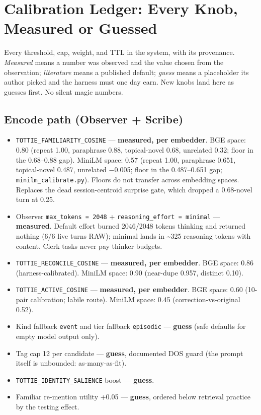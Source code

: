 \chapter{Calibration Ledger: Every Knob, Measured or Guessed}

Every threshold, cap, weight, and TTL in the system, with its provenance.
\textit{Measured} means a number was observed and the value chosen from the
observation; \textit{literature} means a published default; \textit{guess}
means a placeholder its author picked and the harness must one day earn.
New knobs land here as guesses first. No silent magic numbers.

\section{Encode path (Observer + Scribe)}

\begin{itemize}
\item \texttt{TOTTIE\_FAMILIARITY\_COSINE} --- \textbf{measured, per
embedder}. BGE space: 0.80 (repeat 1.00, paraphrase 0.88, topical-novel
0.68, unrelated 0.32; floor in the 0.68--0.88 gap). MiniLM space: 0.57
(repeat 1.00, paraphrase 0.651, topical-novel 0.487, unrelated $-$0.005;
floor in the 0.487--0.651 gap; \texttt{minilm\_calibrate.py}). Floors do
not transfer across embedding spaces. Replaces the dead session-centroid
surprise gate, which dropped a 0.68-novel turn at 0.25.
\item Observer \texttt{max\_tokens = 2048} + \texttt{reasoning\_effort =
minimal} --- \textbf{measured}. Default effort burned 2046/2048 tokens
thinking and returned nothing (6/6 live turns RAW); minimal lands in
\textasciitilde325 reasoning tokens with content. Clerk tasks never pay
thinker budgets.
\item \texttt{TOTTIE\_RECONCILE\_COSINE} --- \textbf{measured, per
embedder}. BGE space: 0.86 (harness-calibrated). MiniLM space: 0.90
(near-dupe 0.957, distinct 0.10).
\item \texttt{TOTTIE\_ACTIVE\_COSINE} --- \textbf{measured, per embedder}.
BGE space: 0.60 (10-pair calibration; labile route). MiniLM space: 0.45
(correction-vs-original 0.52).
\item Kind fallback \texttt{event} and tier fallback \texttt{episodic} ---
\textbf{guess} (safe defaults for empty model output only).
\item Tag cap 12 per candidate --- \textbf{guess}, documented DOS guard
(the prompt itself is unbounded: as-many-as-fit).
\item \texttt{TOTTIE\_IDENTITY\_SALIENCE} boost --- \textbf{guess}.
\item Familiar re-mention utility +0.05 --- \textbf{guess}, ordered below
retrieval practice by the testing effect.
\end{itemize}

